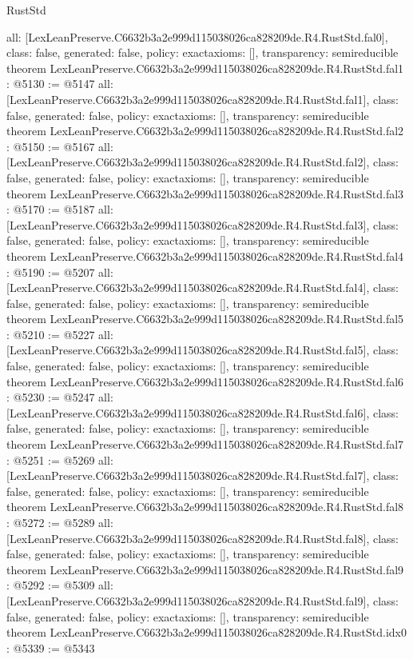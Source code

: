 \begin{lexlean}{RustStd}
\begin{coremodule}
{  all: [LexLeanPreserve.C6632b3a2e999d115038026ca828209de.R4.RustStd.fal0],
  class: false,
  generated: false,
  policy: exact{axioms: []},
  transparency: semireducible
}
theorem LexLeanPreserve.C6632b3a2e999d115038026ca828209de.R4.RustStd.fal1 : @5130 := @5147 {
  all: [LexLeanPreserve.C6632b3a2e999d115038026ca828209de.R4.RustStd.fal1],
  class: false,
  generated: false,
  policy: exact{axioms: []},
  transparency: semireducible
}
theorem LexLeanPreserve.C6632b3a2e999d115038026ca828209de.R4.RustStd.fal2 : @5150 := @5167 {
  all: [LexLeanPreserve.C6632b3a2e999d115038026ca828209de.R4.RustStd.fal2],
  class: false,
  generated: false,
  policy: exact{axioms: []},
  transparency: semireducible
}
theorem LexLeanPreserve.C6632b3a2e999d115038026ca828209de.R4.RustStd.fal3 : @5170 := @5187 {
  all: [LexLeanPreserve.C6632b3a2e999d115038026ca828209de.R4.RustStd.fal3],
  class: false,
  generated: false,
  policy: exact{axioms: []},
  transparency: semireducible
}
theorem LexLeanPreserve.C6632b3a2e999d115038026ca828209de.R4.RustStd.fal4 : @5190 := @5207 {
  all: [LexLeanPreserve.C6632b3a2e999d115038026ca828209de.R4.RustStd.fal4],
  class: false,
  generated: false,
  policy: exact{axioms: []},
  transparency: semireducible
}
theorem LexLeanPreserve.C6632b3a2e999d115038026ca828209de.R4.RustStd.fal5 : @5210 := @5227 {
  all: [LexLeanPreserve.C6632b3a2e999d115038026ca828209de.R4.RustStd.fal5],
  class: false,
  generated: false,
  policy: exact{axioms: []},
  transparency: semireducible
}
theorem LexLeanPreserve.C6632b3a2e999d115038026ca828209de.R4.RustStd.fal6 : @5230 := @5247 {
  all: [LexLeanPreserve.C6632b3a2e999d115038026ca828209de.R4.RustStd.fal6],
  class: false,
  generated: false,
  policy: exact{axioms: []},
  transparency: semireducible
}
theorem LexLeanPreserve.C6632b3a2e999d115038026ca828209de.R4.RustStd.fal7 : @5251 := @5269 {
  all: [LexLeanPreserve.C6632b3a2e999d115038026ca828209de.R4.RustStd.fal7],
  class: false,
  generated: false,
  policy: exact{axioms: []},
  transparency: semireducible
}
theorem LexLeanPreserve.C6632b3a2e999d115038026ca828209de.R4.RustStd.fal8 : @5272 := @5289 {
  all: [LexLeanPreserve.C6632b3a2e999d115038026ca828209de.R4.RustStd.fal8],
  class: false,
  generated: false,
  policy: exact{axioms: []},
  transparency: semireducible
}
theorem LexLeanPreserve.C6632b3a2e999d115038026ca828209de.R4.RustStd.fal9 : @5292 := @5309 {
  all: [LexLeanPreserve.C6632b3a2e999d115038026ca828209de.R4.RustStd.fal9],
  class: false,
  generated: false,
  policy: exact{axioms: []},
  transparency: semireducible
}
theorem LexLeanPreserve.C6632b3a2e999d115038026ca828209de.R4.RustStd.idx0 : @5339 := @5343 {
}
\end{coremodule}
\end{lexlean}
